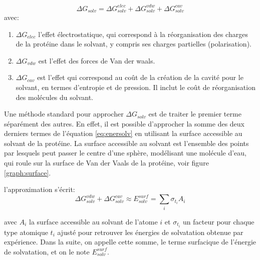 \begin{equation}
  \label{eq:enersolv}
  \Delta G_{solv} = \Delta G_{solv}^{elec} + \Delta G_{solv}^{vdw} + \Delta G_{solv}^{cav}
\end{equation}
avec:

\begin{enumerate}
\item $\Delta G_{elec}$ l'effet électrostatique, qui correspond à la réorganisation des charges de la protéine dans le solvant, y compris ses charges partielles (polarisation).
\item $\Delta G_{vdw}$ est l'effet des forces de Van der waals.
  \item $\Delta G_{cav}$ est l'effet qui correspond au coût de la création de la cavité pour le solvant, en termes d'entropie et de pression. Il inclut le coût de réorganisation des molécules du solvant.
\end{enumerate}

Une méthode standard pour approcher $\Delta G_{solv}$ est de traiter le premier terme séparément des autres. En effet, il est possible d'approcher la somme des deux derniers termes de l'équation  \ref{eq:enersolv} en utilisant la surface accessible au solvant de la protéine. La surface accessible au solvant est l'ensemble des points par lesquels peut passer le centre d'une sphère, modélisant une molécule d'eau, qui roule sur la surface de Van der Vaals de la protéine, voir figure \ref{graph:surface}.

l'approximation s'écrit:
\begin{equation}
  \label{eq:SA}
\Delta G_{solv}^{vdw} + \Delta G_{solv}^{cav} \approx E_{solv}^{surf} = \sum_i \sigma_{t_i} A_i
\end{equation}

avec $A_i$ la surface accessible au solvant de l'atome $i$  et $\sigma_{t_i}$ un facteur pour chaque type atomique $t_i$ ajusté pour retrouver les énergies de solvatation obtenue par expérience.
Dans la suite, on appelle cette somme, le terme surfacique de l'énergie de solvatation, et on le note $E_{solv}^{surf}$.

